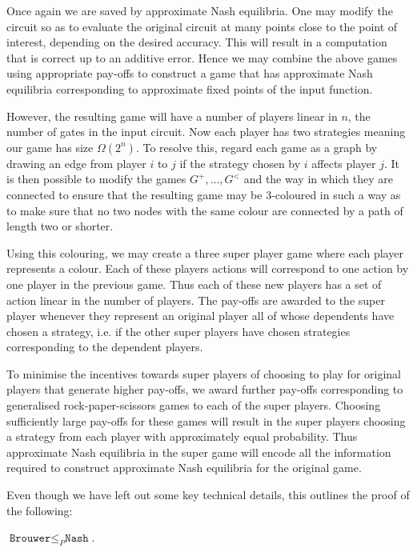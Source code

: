 \documentclass{article}
\begin{document}
Once again we are saved by approximate Nash equilibria. One may
modify the circuit so as to evaluate the original circuit at many
points close to the point of interest, depending on the desired
accuracy. This will result in a computation that is correct up to
an additive error. Hence we may combine the above games using
appropriate pay-offs to construct a game that has approximate
Nash equilibria corresponding to approximate fixed points of the
input function.

However, the resulting game will have a number of players linear in $n$,
the number of gates in the input circuit. Now each player has two strategies
meaning our game has size $\Omega(2^n)$. To resolve this, regard
each game as a graph by drawing an edge from player $i$ to $j$ if
the strategy chosen by $i$ affects player $j$. It is then possible
to modify the games $G^+,\ldots,G^<$ and the way in which they are connected
to ensure that the resulting game may be 3-coloured in such a way as
to make sure that no two nodes with the same colour are connected by a
path of length two or shorter.

Using this colouring, we may create a three super player game where each
player represents a colour. Each of these players actions will correspond
to one action by one player in the previous game. Thus each of these
new players has a set of action linear in the number of players.
The pay-offs are awarded to the super player whenever they represent
an original player all of whose dependents have chosen a strategy,
i.e. if the other super players have chosen strategies corresponding
to the dependent players.

To minimise the incentives towards super players of choosing to play
for original players that generate higher pay-offs, we award further
pay-offs corresponding to generalised rock-paper-scissors games to
each of the super players. Choosing sufficiently large pay-offs for these
games will result in the super players choosing a strategy from each
player with approximately equal probability. Thus approximate Nash
equilibria in the super game will encode all the information required
to construct approximate Nash equilibria for the original game.

Even though we have left out some key technical details, this outlines
the proof of the following:

\begin{theorem}
  $\texttt{Brouwer}\leq_P\texttt{Nash}$.
\end{theorem}
\end{document}
